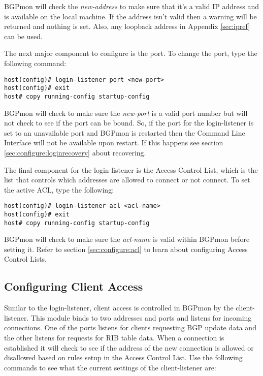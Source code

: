 BGPmon will check the \emph{new-address} to make sure that it's a valid IP address and is available on the local machine.  If the address isn't valid then a warning will be returned and nothing is set. Also, any loopback address in Appendix \ref{sec:ipref} can be used.

The next major component to configure is the port.  To change the port, type the following command: \\

\begin{Verbatim}[frame=single]
host(config)# login-listener port <new-port>
host(config)# exit
host# copy running-config startup-config
\end{Verbatim}

BGPmon will check to make sure the \emph{new-port} is a valid port number but will not check to see if the port can be bound.  So, if the port for the login-listener is set to an unavailable port and BGPmon is restarted then the Command Line Interface will not be available upon restart.  If this happens see section \ref{sec:configure:loginrecovery} about recovering.

The final component for the login-listener is the Access Control List, which is the list that controls which addresses are allowed to connect or not connect. To set the active ACL, type the following:\\

\begin{Verbatim}[frame=single]
host(config)# login-listener acl <acl-name>
host(config)# exit
host# copy running-config startup-config
\end{Verbatim}

BGPmon will check to make sure the \emph{acl-name} is valid within BGPmon before setting it.
Refer to section \ref{sec:configure:acl} to learn about configuring Access Control Lists.


\subsection{Configuring Client Access}
\label{sec:configure:client}

Similar to the login-listener, client access is controlled in BGPmon by the client-listener.
This module binds to two addresses and ports and listens for incoming connections.
One of the ports listens for clients requesting BGP update data and the other listens for requests for RIB table data.
When a connection is established it will check to see if the address of the new connection is allowed or disallowed based on rules setup in the Access Control List.
Use the following commands to see what the current settings of the client-listener are: \\

